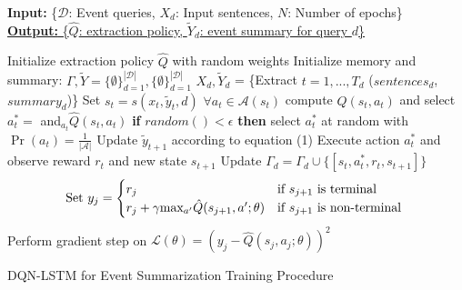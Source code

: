 \documentclass[12pt]{article}
\begin{document}
\begin{algorithm}
    \textbf{Input:} { \rm  \{$\mathcal{D}$: Event queries, $X_d$: Input sentences, $N$: Number of epochs\} } \\
    \underline{\textbf{Output:} \rm \{$\hat{Q}$: extraction policy, $\tilde{Y}_d$: event summary for query $d$\} }
\begin{algorithmic}[1]
\vspace{-0.5cm}
\STATE \rm Initialize extraction policy $\hat{Q}$ with random weights
\STATE \rm Initialize memory and summary: $\Gamma, \tilde{Y} =  \{\emptyset \}^{\mathcal{|D|}}_{d=1},  \{\emptyset \}^{\mathcal{|D|}}_{d=1} $
		\STATE $X_{d}, \tilde{Y}_{d}$ = \{Extract $t=1,...,T_d$ ($sentences_d$, $summary_d$)\}
			\STATE Set $s_t = s(x_t, \tilde{y}_t, d)$
			\STATE $ \forall a_t \in \mathcal{A}(s_t)$ \textrm{compute} $\hat{Q}(s_t, a_t)$ and select $a^{*}_t =$ and$_{a_{t}}\hat{Q}(s_t, a_t)$
			\STATE  \textbf{if} $random() < \epsilon$ \textbf{then} select $a^{*}_t $ at random with $\Pr(a_t) =\frac{1}{| \mathcal{A} |} $
			\STATE Update $\tilde{y}_{t+1}$ according to equation (1)
			\STATE Execute action $a^{*}_t$ and observe reward $r_t$ and new state $s_{t+1}$
			\STATE Update $\Gamma_d = \Gamma_d \cup \{ [s_t, a^{*}_t, r_t, s_{t+1}]\}$
		\ENDFOR
	\ENDFOR
			\STATE \[\textrm{Set } y_j =
					\begin{cases}
						r_j              								& \text{if $s_{j+1}$ is terminal } \\
					     	r_j + \gamma $max$_{a'}\hat{Q}(s_{j+1}, a'; \theta) 	& \text{if $s_{j+1}$ is non-terminal } 
					\end{cases} 
					\]
        			\STATE Perform gradient step on $\mathcal{L}(\theta) = (y_j - \hat{Q}(s_j, a_j; \theta))^2$
		\ENDFOR
\ENDFOR
  \end{algorithmic}
    \caption{DQN-LSTM for Event Summarization Training Procedure}
\end{algorithm}
\end{document}
